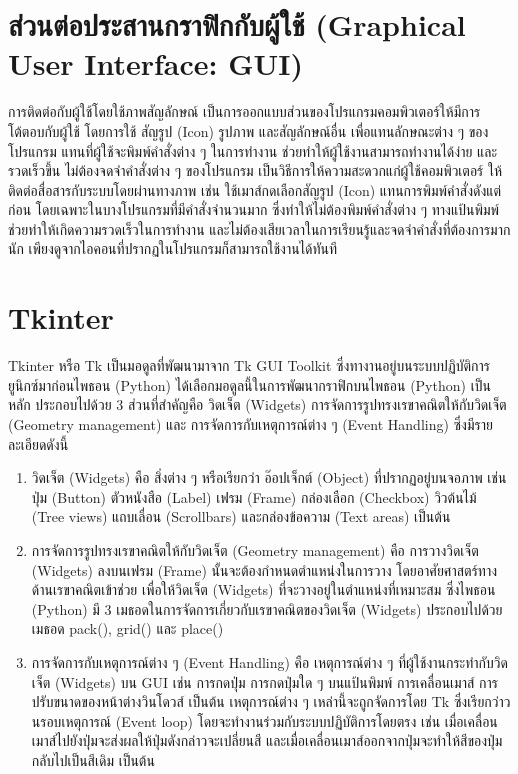 \section{ส่วนต่อประสานกราฟิกกับผู้ใช้ (Graphical User Interface: GUI)}
การติดต่อกับผู้ใช้โดยใช้ภาพสัญลักษณ์ เป็นการออกแบบส่วนของโปรแกรมคอมพิวเตอร์ให้มีการโต้ตอบกับผู้ใช้ โดยการใช้ สัญรูป (Icon) รูปภาพ และสัญลักษณ์อื่น 
เพื่อแทนลักษณะต่าง ๆ ของโปรแกรม แทนที่ผู้ใช้จะพิมพ์คำสั่งต่าง ๆ ในการทำงาน ช่วยทำให้ผู้ใช้งานสามารถทำงานได้ง่าย และรวดเร็วขึ้น ไม่ต้องจดจำคำสั่งต่าง ๆ 
ของโปรแกรม เป็นวิธีการให้ความสะดวกแก่ผู้ใช้คอมพิวเตอร์ ให้ติดต่อสื่อสารกับระบบโดยผ่านทางภาพ เช่น ใช้เมาส์กดเลือกสัญรูป (Icon) แทนการพิมพ์คำสั่งดังแต่ก่อน 
โดยเฉพาะในบางโปรแกรมที่มีคำสั่งจำนวนมาก ซึ่งทำให้ไม่ต้องพิมพ์คำสั่งต่าง ๆ ทางแป้นพิมพ์ ช่วยทำให้เกิดความรวดเร็วในการทำงาน 
และไม่ต้องเสียเวลาในการเรียนรู้และจดจำคำสั่งที่ต้องการมากนัก เพียงดูจากไอคอนที่ปรากฏในโปรแกรมก็สามารถใช้งานได้ทันที \cite{GUI}

\section{Tkinter}
Tkinter หรือ Tk เป็นมอดูลที่พัฒนามาจาก Tk GUI Toolkit ซึ่งทางานอยู่บนระบบปฏิบัติการยูนิกซ์มาก่อนไพธอน (Python) ได้เลือกมอดูลนี้ในการพัฒนากราฟิกบนไพธอน (Python) เป็นหลัก
ประกอบไปด้วย 3 ส่วนที่สำคัญคือ วิดเจ็ต (Widgets) การจัดการรูปทรงเรขาคณิตให้กับวิดเจ็ต (Geometry management) และ การจัดการกับเหตุการณ์ต่าง ๆ (Event Handling) \cite{Tkinter} ซึ่งมีรายละเอียดดังนี้
\begin{enumerate}
  \item วิดเจ็ต (Widgets) คือ สิ่งต่าง ๆ หรือเรียกว่า อ๊อปเจ็กต์ (Object) ที่ปรากฏอยู่บนจอภาพ เช่น ปุ่ม (Button) ตัวหนังสือ (Label) เฟรม (Frame) กล่องเลือก (Checkbox) 
  วิวต้นไม้ (Tree views) แถบเลื่อน (Scrollbars) และกล่องข้อความ (Text areas) เป็นต้น
  \item การจัดการรูปทรงเรขาคณิตให้กับวิดเจ็ต (Geometry management) คือ การวางวิดเจ็ต (Widgets) ลงบนเฟรม (Frame) นั้นจะต้องกำหนดตำแหน่งในการวาง 
  โดยอาศัยศาสตร์ทางด้านเรขาคณิตเข้าช่วย เพื่อให้วิดเจ็ต (Widgets) ที่จะวางอยู่ในตำแหน่งที่เหมาะสม ซึ่งไพธอน (Python) มี 3 เมธอดในการจัดการเกี่ยวกับเรขาคณิตของวิดเจ็ต (Widgets) 
  ประกอบไปด้วยเมธอด pack(), grid() และ place()
  \item การจัดการกับเหตุการณ์ต่าง ๆ (Event Handling)  คือ เหตุการณ์ต่าง ๆ ที่ผู้ใช้งานกระทำกับวิดเจ็ต (Widgets) บน GUI เช่น การกดปุ่ม การกดปุ่มใด ๆ บนแป้นพิมพ์ 
  การเคลื่อนเมาส์ การปรับขนาดของหน้าต่างวินโดวส์ เป็นต้น เหตุการณ์ต่าง ๆ เหล่านี้จะถูกจัดการโดย Tk ซึ่งเรียกว่าวนรอบเหตุการณ์ (Event loop) โดยจะทำงานร่วมกับระบบปฏิบัติการโดยตรง 
  เช่น เมื่อเคลื่อนเมาส์ไปยังปุ่มจะส่งผลให้ปุ่มดังกล่าวจะเปลี่ยนสี และเมื่อเคลื่อนเมาส์ออกจากปุ่มจะทำให้สีของปุ่มกลับไปเป็นสีเดิม เป็นต้น
\end{enumerate}

